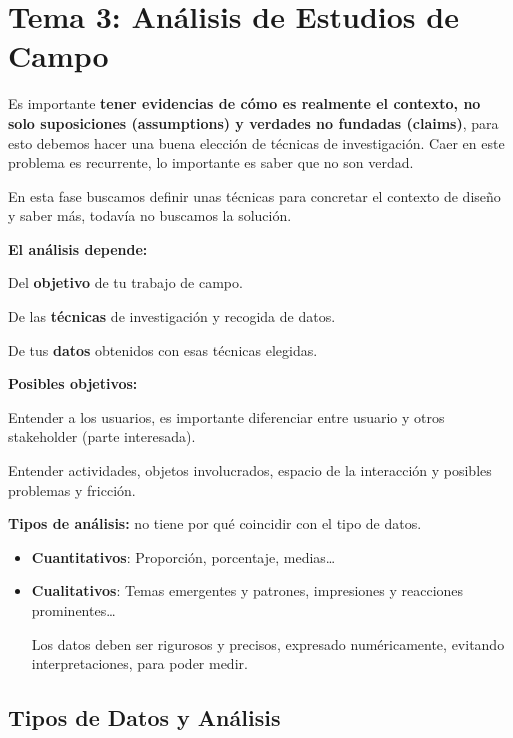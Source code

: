 \documentclass[12pt, twoside, openright]{report} %
\begin{document}
\chapter{Tema 3: Análisis de Estudios de
  Campo}

Es importante \textbf{tener evidencias de cómo es realmente el contexto,
	no solo suposiciones (assumptions) y verdades no fundadas (claims)},
para esto debemos hacer una buena elección de técnicas de investigación.
Caer en este problema es recurrente, lo importante es saber que no son
verdad.

En esta fase buscamos definir unas técnicas para concretar el contexto
de diseño y saber más, todavía no buscamos la solución.

\textbf{El análisis depende:}

Del \textbf{objetivo} de tu trabajo de campo.

De las \textbf{técnicas} de investigación y recogida de datos.

De tus \textbf{datos} obtenidos con esas técnicas elegidas.

\textbf{Posibles objetivos:}

Entender a los usuarios, es importante diferenciar entre usuario y otros
stakeholder (parte interesada).

Entender actividades, objetos involucrados, espacio de la interacción y
posibles problemas y fricción.

\textbf{Tipos de análisis:} no tiene por qué coincidir con el tipo de
datos.

\begin{itemize}
	\item \textbf{Cuantitativos}: Proporción, porcentaje, medias\ldots{}
	\item \textbf{Cualitativos}: Temas emergentes y patrones, impresiones y
	      reacciones prominentes\ldots{}

	      Los datos deben ser rigurosos y precisos, expresado numéricamente,
	      evitando interpretaciones, para poder medir.
\end{itemize}

\section{Tipos de Datos y
  Análisis}
\end{document}
